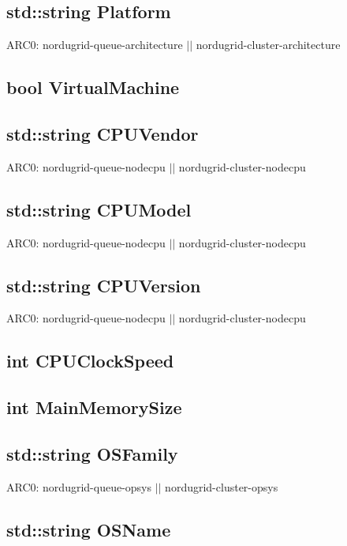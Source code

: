 \documentclass{book}
\begin{document}
\subsection*{std::string Platform}

ARC0: nordugrid-queue-architecture $||$ nordugrid-cluster-architecture

\subsection*{bool VirtualMachine}

\subsection*{std::string CPUVendor}

ARC0: nordugrid-queue-nodecpu $||$ nordugrid-cluster-nodecpu

\subsection*{std::string CPUModel}

ARC0: nordugrid-queue-nodecpu $||$ nordugrid-cluster-nodecpu

\subsection*{std::string CPUVersion}

ARC0: nordugrid-queue-nodecpu $||$ nordugrid-cluster-nodecpu

\subsection*{int CPUClockSpeed}

\subsection*{int MainMemorySize}

\subsection*{std::string OSFamily}

ARC0: nordugrid-queue-opsys $||$ nordugrid-cluster-opsys

\subsection*{std::string OSName}
\end{document}
